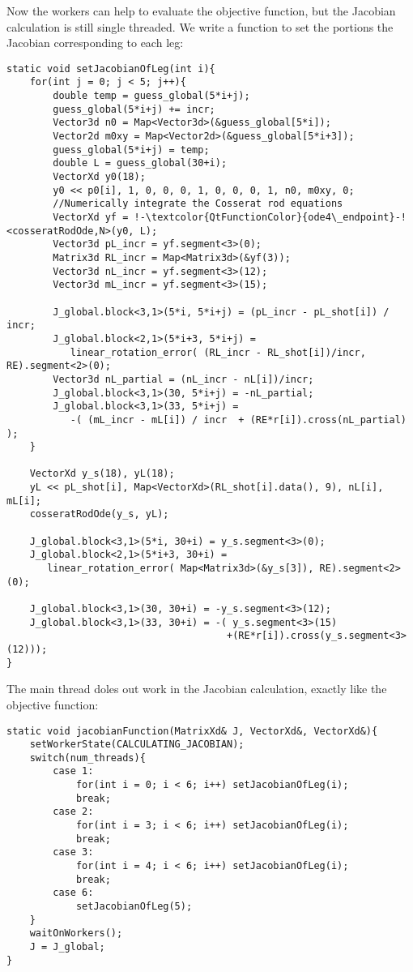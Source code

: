 \documentclass[12pt]{article}
\begin{document}
\clearpage \noindent
Now the workers can help to evaluate the objective function, but the Jacobian calculation is still single threaded.
We write a function to set the portions the Jacobian corresponding to each leg:
\begin{lstlisting}
static void setJacobianOfLeg(int i){
    for(int j = 0; j < 5; j++){
        double temp = guess_global(5*i+j);
        guess_global(5*i+j) += incr;
        Vector3d n0 = Map<Vector3d>(&guess_global[5*i]);
        Vector2d m0xy = Map<Vector2d>(&guess_global[5*i+3]);
        guess_global(5*i+j) = temp;
        double L = guess_global(30+i);
        VectorXd y0(18);
        y0 << p0[i], 1, 0, 0, 0, 1, 0, 0, 0, 1, n0, m0xy, 0;
        //Numerically integrate the Cosserat rod equations
        VectorXd yf = !-\textcolor{QtFunctionColor}{ode4\_endpoint}-!<cosseratRodOde,N>(y0, L);
        Vector3d pL_incr = yf.segment<3>(0);
        Matrix3d RL_incr = Map<Matrix3d>(&yf(3));
        Vector3d nL_incr = yf.segment<3>(12);
        Vector3d mL_incr = yf.segment<3>(15);

        J_global.block<3,1>(5*i, 5*i+j) = (pL_incr - pL_shot[i]) / incr;
        J_global.block<2,1>(5*i+3, 5*i+j) =
           linear_rotation_error( (RL_incr - RL_shot[i])/incr, RE).segment<2>(0);
        Vector3d nL_partial = (nL_incr - nL[i])/incr;
        J_global.block<3,1>(30, 5*i+j) = -nL_partial;
        J_global.block<3,1>(33, 5*i+j) =
           -( (mL_incr - mL[i]) / incr  + (RE*r[i]).cross(nL_partial) );
    }

    VectorXd y_s(18), yL(18);
    yL << pL_shot[i], Map<VectorXd>(RL_shot[i].data(), 9), nL[i], mL[i];
    cosseratRodOde(y_s, yL);

    J_global.block<3,1>(5*i, 30+i) = y_s.segment<3>(0);
    J_global.block<2,1>(5*i+3, 30+i) =
       linear_rotation_error( Map<Matrix3d>(&y_s[3]), RE).segment<2>(0);

    J_global.block<3,1>(30, 30+i) = -y_s.segment<3>(12);
    J_global.block<3,1>(33, 30+i) = -( y_s.segment<3>(15)
                                      +(RE*r[i]).cross(y_s.segment<3>(12)));
}
\end{lstlisting}
The main thread doles out work in the Jacobian calculation, exactly like the objective function:
\begin{lstlisting}
static void jacobianFunction(MatrixXd& J, VectorXd&, VectorXd&){
    setWorkerState(CALCULATING_JACOBIAN);
    switch(num_threads){
        case 1:
            for(int i = 0; i < 6; i++) setJacobianOfLeg(i);
            break;
        case 2:
            for(int i = 3; i < 6; i++) setJacobianOfLeg(i);
            break;
        case 3:
            for(int i = 4; i < 6; i++) setJacobianOfLeg(i);
            break;
        case 6:
            setJacobianOfLeg(5);
    }
    waitOnWorkers();
    J = J_global;
}
\end{lstlisting}
\end{document}
